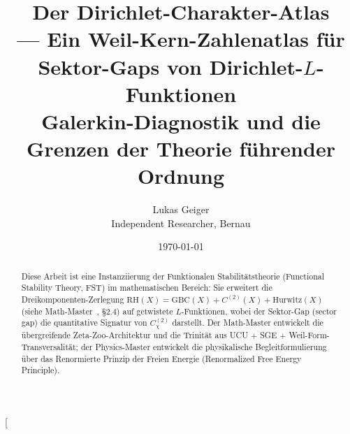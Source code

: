 \documentclass[a4paper,10pt,twocolumn]{article}
\title{Der Dirichlet-Charakter-Atlas\\
  \large --- Ein Weil-Kern-Zahlenatlas für Sektor-Gaps von Dirichlet-$L$-Funktionen\\
  \normalsize Galerkin-Diagnostik und die Grenzen der Theorie führender Ordnung}
\author{Lukas Geiger\\\small Independent Researcher, Bernau}
\date{\today}
\theoremstyle{definition}
\theoremstyle{remark}
\newcommand{\chifn}{\chi}
\begin{document}
\twocolumn[
\maketitle
\begin{abstract}
\noindent
Diese Arbeit ist eine Instanziierung der Funktionalen Stabilitätstheorie
(Functional Stability Theory, FST) im mathematischen Bereich: Sie erweitert die
Dreikomponenten-Zerlegung $\mathrm{RH}(X) = \mathrm{GBC}(X) + C^{(2)}(X) + \mathrm{Hurwitz}(X)$
(siehe Math-Master~\cite{MathMaster}, \S2.4) auf
getwistete $L$-Funktionen, wobei der Sektor-Gap (sector gap) die quantitative
Signatur von $C^{(2)}_{\chifn}$ darstellt. Der Math-Master
\cite{MathMaster} entwickelt die übergreifende Zeta-Zoo-Architektur und
die Trinität aus UCU + SGE + Weil-Form-Transversalität; der Physics-Master
\cite{RFEPFramework} entwickelt die physikalische Begleitformulierung
über das Renormierte Prinzip der Freien Energie (Renormalized Free Energy Principle).


\end{abstract}
\end{document}
